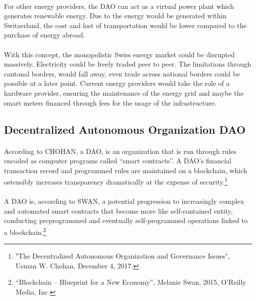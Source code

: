 \documentclass{scrartcl}
\begin{document}
    \paragraph{}
    For other energy providers, the DAO can act as a virtual power plant which generates renewable energy. Due to the energy would be generated within Switzerland, the cost and lost of transportation would be lower compared to the purchase of energy abroad.
    
     \paragraph{}
     With this concept, the monopolistic Swiss energy market could be disrupted massively. Electricity could be freely traded peer to peer. The limitations through cantonal borders, would fall away, even trade across national borders could be possible at a later point. Current energy providers would take the role of a hardware provider, ensuring the maintenance of the energy grid and maybe the smart meters financed through fees for the usage of the infrastructure.
     
     \subsection{Decentralized Autonomous Organization DAO}
     
     \paragraph{}
     According to CHOHAN, a DAO, is an organization that is run through rules encoded as computer programs called “smart contracts”. A DAO's financial transaction record and programmed rules are maintained on a blockchain, which ostensibly increases transparency dramatically at the expense of security.\footnote{"The Decentralized Autonomous Organization and Governance Issues", Usman W. Chohan, December 4, 2017.}
     
     \paragraph{}
     A DAO is, according to SWAN, a potential progression to increasingly complex and automated smart contracts that become more like self-contained entity, conducting preprogrammed and eventually self-programmed operations linked to a blockchain.\footnote{“Blockchain – Blueprint for a New Economy”, Melanie Swan, 2015, O’Reilly Media, Inc.}
     
\end{document}
